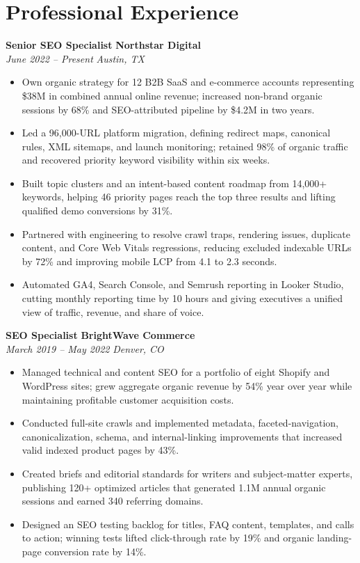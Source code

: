 \documentclass[10pt,a4paper]{article}
\newcommand{\role}[4]{%
  \textbf{#1} \hfill \textbf{#2}\\[-0.08em]
  \textit{#3} \hfill \textit{#4}\par
}
\begin{document}
\section*{Professional Experience}
\role{Senior SEO Specialist}{Northstar Digital}{June 2022 -- Present}{Austin, TX}
\begin{itemize}
  \item Own organic strategy for 12 B2B SaaS and e-commerce accounts representing \$38M in combined annual online revenue; increased non-brand organic sessions by 68\% and SEO-attributed pipeline by \$4.2M in two years.
  \item Led a 96,000-URL platform migration, defining redirect maps, canonical rules, XML sitemaps, and launch monitoring; retained 98\% of organic traffic and recovered priority keyword visibility within six weeks.
  \item Built topic clusters and an intent-based content roadmap from 14,000+ keywords, helping 46 priority pages reach the top three results and lifting qualified demo conversions by 31\%.
  \item Partnered with engineering to resolve crawl traps, rendering issues, duplicate content, and Core Web Vitals regressions, reducing excluded indexable URLs by 72\% and improving mobile LCP from 4.1 to 2.3 seconds.
  \item Automated GA4, Search Console, and Semrush reporting in Looker Studio, cutting monthly reporting time by 10 hours and giving executives a unified view of traffic, revenue, and share of voice.
\end{itemize}

\role{SEO Specialist}{BrightWave Commerce}{March 2019 -- May 2022}{Denver, CO}
\begin{itemize}
  \item Managed technical and content SEO for a portfolio of eight Shopify and WordPress sites; grew aggregate organic revenue by 54\% year over year while maintaining profitable customer acquisition costs.
  \item Conducted full-site crawls and implemented metadata, faceted-navigation, canonicalization, schema, and internal-linking improvements that increased valid indexed product pages by 43\%.
  \item Created briefs and editorial standards for writers and subject-matter experts, publishing 120+ optimized articles that generated 1.1M annual organic sessions and earned 340 referring domains.
  \item Designed an SEO testing backlog for titles, FAQ content, templates, and calls to action; winning tests lifted click-through rate by 19\% and organic landing-page conversion rate by 14\%.
\end{itemize}
\end{document}
